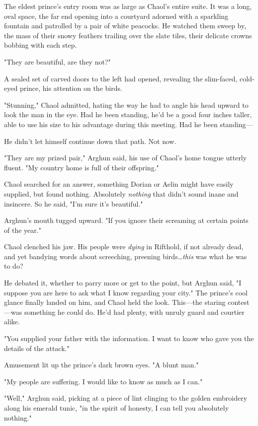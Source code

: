 The eldest prince's entry room was as large as Chaol's entire suite. It was a long, oval space, the far end opening into a courtyard adorned with a sparkling fountain and patrolled by a pair of white peacocks. He watched them sweep by, the mass of their snowy feathers trailing over the slate tiles, their delicate crowns bobbing with each step.

"They are beautiful, are they not?"

A sealed set of carved doors to the left had opened, revealing the slim-faced, cold-eyed prince, his attention on the birds.

"Stunning," Chaol admitted, hating the way he had to angle his head upward to look the man in the eye. Had he been standing, he'd be a good four inches taller, able to use his size to his advantage during this meeting. Had he been standing---

He didn't let himself continue down that path. Not now.

"They are my prized pair," Arghun said, his use of Chaol's home tongue utterly fluent. "My country home is full of their offspring."

Chaol searched for an answer, something Dorian or Aelin might have easily supplied, but found nothing. Absolutely \emph{nothing} that didn't sound inane and insincere. So he said, "I'm sure it's beautiful."

Arghun's mouth tugged upward. "If you ignore their screaming at certain points of the year."

Chaol clenched his jaw. His people were \emph{dying} in Rifthold, if not already dead, and yet bandying words about screeching, preening birds\ldots \emph{this} was what he was to do?

He debated it, whether to parry more or get to the point, but Arghun said, "I suppose you are here to ask what I know regarding your city." The prince's cool glance finally landed on him, and Chaol held the look. This---the staring contest ---was something he could do. He'd had plenty, with unruly guard and courtier alike.

"You supplied your father with the information. I want to know who gave you the details of the attack."

Amusement lit up the prince's dark brown eyes. "A blunt man."

"My people are suffering. I would like to know as much as I can."

"Well," Arghun said, picking at a piece of lint clinging to the golden embroidery along his emerald tunic, "in the spirit of honesty, I can tell you absolutely nothing."

